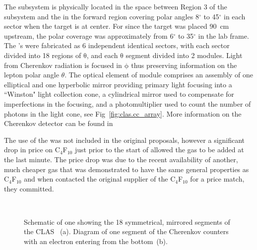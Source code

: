 The  subsystem is physically located in the space between Region 3 of the  subsystem and the  in the forward region covering polar angles 8$^\circ$ to 45$^\circ$ in each sector when the target is at  center. For  since the target was placed 90~cm upstream, the polar coverage was approximately from 6$^\circ$ to 35$^\circ$ in the lab frame. The  's were fabricated as 6 independent identical sectors, with each sector divided into 18 regions of $\mathrm{\theta}$, and each $\mathrm{\theta}$ segment divided into 2 modules. Light from Cherenkov radiation is focused in $\mathrm{\phi}$ thus preserving information on the lepton polar angle $\theta$. The optical element of  module comprises an assembly of one elliptical and one hyperbolic mirror providing primary light focusing into a  ``Winston" light collection cone, a  cylindrical mirror used to compensate for imperfections in the focusing, and a photomultiplier used to count the  number of photons in the light cone, see Fig~\ref{fig:clas.cc_array}. More information on the  Cherenkov detector can be found in~\cite{clas.cc} 

The use of the  was not included in the original proposals, however a significant drop in price on C$_4$F$_{10}$ just prior to the start of  allowed the gas to be added at the last minute. The price drop was due to the recent availability of another, much cheaper gas that was demonstrated to have the same general properties as C$_4$F$_{10}$ and when  contacted the original supplier of the C$_4$F$_{10}$ for a price match, they committed. 

\begin{figure}[h!]\begin{center}
\\
\caption[Schematic of one  showing the 18 symmetrical, mirrored segments of the CLAS ]{Schematic of one  showing the 18 symmetrical, mirrored segments of the CLAS ~(a). Diagram of one segment of the Cherenkov counters with an electron entering from the bottom~(b).}

\end{center}\end{figure}





